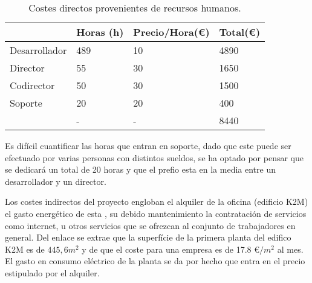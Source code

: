 \begin{table}[ht!]
\begin{tabular}{l|l|l|l|}
\cline{2-4}
                                                    & Horas (h) & Precio/Hora(\euro) & Total(\euro) \\ \hline
\multicolumn{1}{|l|}{Desarrollador}                 & 489       & 10               & 4890     \\ \hline
\multicolumn{1}{|l|}{Director}                      & 55        & 30               & 1650     \\ \hline
\multicolumn{1}{|l|}{Codirector}                    & 50        & 30               & 1500     \\ \hline
\multicolumn{1}{|l|}{Soporte}                       & 20        & 20               & 400      \\ \hline
\rowcolor{gray!50}
\multicolumn{1}{|l|}{Total} &    -       &  -              &  8440        \\ \hline
\end{tabular}
\caption{Costes directos provenientes de recursos humanos.}
\end{table}

Es difícil cuantificar las horas que entran en soporte, dado que este puede ser efectuado por varias personas con distintos sueldos, se ha optado por pensar que se dedicará un total de 20 horas y que el prefio esta en la media entre un desarrollador y un director.

\par\bigskip

Los costes indirectos del proyecto engloban el alquiler de la oficina (edificio K2M) el gasto energético de esta , su debido mantenimiento la contratación de servicios como internet, u otros servicios que se ofrezcan al conjunto de trabajadores en general. Del enlace \cite{k2msuperficie} se extrae que la superfície de la primera planta del edifico K2M es de $445,6 m^{2}$ y de \cite{k2mpreu} que el coste para una empresa es de 17.8 \euro$/m^{2}$ al mes. El gasto en consumo eléctrico de la planta se da por hecho que entra en el precio estipulado por el alquiler.

